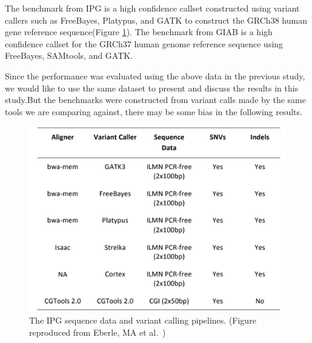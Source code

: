 \documentclass[PhD]{PHlab-thesis}
\begin{document}
\begin{table}[h!]
	\centering
	\caption{The Dataset of Experiment.}
	\label{table:1}
\end{table}

The benchmark from IPG is a high confidence callset constructed using variant callers such as FreeBayes, Platypus, and GATK to construct the GRCh38 human gene reference sequence(Figure \ref{fig:IPG VariantCaller}).
The benchmark from GIAB is a high confidence callset for the GRCh37 human genome reference sequence using FreeBayes, SAMtools, and GATK.

Since the performance was evaluated using the above data in the previous study, we would like to use the same dataset to present and discuss the results in this study.But the benchmarks were constructed from variant calls made by the same tools we are comparing against, there may be some bias in the following results.

\begin{figure}[h!]
	\centering
	\includegraphics[scale=0.4]{figures/IPG VariantCaller.png}
	\caption{The IPG sequence data and variant calling pipelines. (Figure reproduced from Eberle, MA et al.~\cite{Eberle2021IPG})}
	\label{fig:IPG VariantCaller} %
\end{figure}
\end{document}
